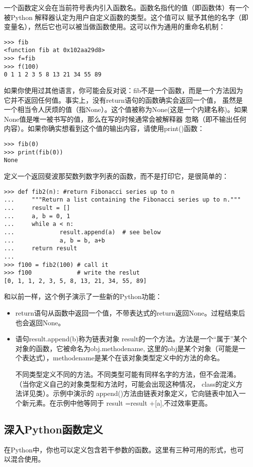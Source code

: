 \documentclass[UTF8]{ctexart}
\begin{document}
一个函数定义会在当前符号表内引入函数名。函数名指代的值（即函数体）有一个被Python 解释器认定为用户自定义函数的类型。这个值可以
赋予其他的名字（即变量名），然后它也可以被当做函数使用。这可以作为通用的重命名机制：
\begin{verbatim}
>>> fib
<function fib at 0x102aa29d8>
>>> f=fib
>>> f(100)
0 1 1 2 3 5 8 13 21 34 55 89
\end{verbatim}
如果你使用过其他语言，你可能会反对说：fib不是一个函数，而是一个方法因为它并不返回任何值。事实上，没有return语句的函数确实会返回一个值，
虽然是一个相当令人厌烦的值（指None）。这个值被称为None(这是一个内建名称)。如果None值是唯一被书写的值，那么在写的时候通常会被解释器
忽略（即不输出任何内容）。如果你确实想看到这个值的输出内容，请使用print()函数：
\begin{verbatim}
>>> fib(0)
>>> print(fib(0))
None
\end{verbatim}

定义一个返回斐波那契数列数字列表的函数，而不是打印它，是很简单的：
\begin{verbatim}
>>> def fib2(n): #return Fibonacci series up to n
...     """Return a list containing the Fibonacci series up to n."""
...     result = []
...     a, b = 0, 1
...     while a < n:
...             result.append(a)  # see below
...             a, b = b, a+b
...     return result
...
>>> f100 = fib2(100) # call it
>>> f100             # write the reslut
[0, 1, 1, 2, 3, 5, 8, 13, 21, 34, 55, 89]
\end{verbatim}

和以前一样，这个例子演示了一些新的Python功能：
\begin{itemize}
  \item return语句从函数中返回一个值，不带表达式的return返回None。过程结束后也会返回None。
  \item 语句result.append(b)称为链表对象 result的一个方法。方法是一个``属于''某个对象的函数，它被命名为obj.methodename,
  这里的obj是某个对象（可能是一个表达式），methodename是某个在该对象类型定义中的方法的命名。

  不同类型定义不同的方法。不同类型可能有同样名字的方法，但不会混淆。（当你定义自己的对象类型和方法时，可能会出现这种情况，
  class的定义方法详见类）。示例中演示的 append()方法由链表对象定义，它向链表中加入一个新元素。在示例中他等同于
  result =result +[a],不过效率更高。
\end{itemize}

\subsection{深入Python函数定义}
在Python中，你也可以定义包含若干参数的函数。这里有三种可用的形式，也可以混合使用。
\end{document}
